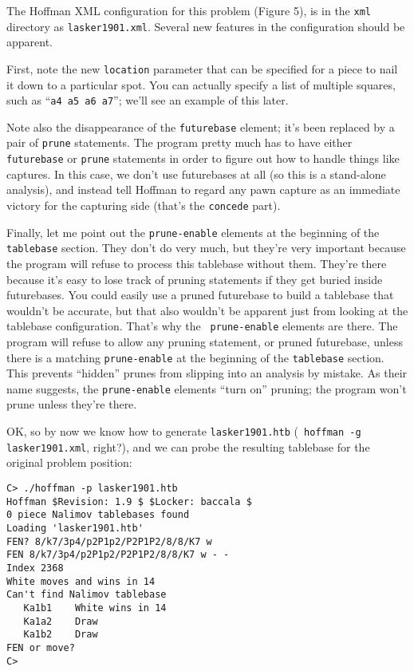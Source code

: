 \documentclass[11pt]{article}
\begin{document}
The Hoffman XML configuration for this problem (Figure 5), is in the
{\tt xml} directory as {\tt lasker1901.xml}.  Several new
features in the configuration should be apparent.

First, note the new {\tt location} parameter that can be specified for
a piece to nail it down to a particular spot.  You can actually
specify a list of multiple squares, such as ``{\tt a4 a5 a6 a7}'';
we'll see an example of this later.

Note also the disappearance of the {\tt futurebase} element; it's been
replaced by a pair of {\tt prune} statements.  The program pretty much
has to have either {\tt futurebase} or {\tt prune} statements in order
to figure out how to handle things like captures.  In this case, we
don't use futurebases at all (so this is a stand-alone analysis), and
instead tell Hoffman to regard any pawn capture as an immediate
victory for the capturing side (that's the {\tt concede} part).

Finally, let me point out the {\tt prune-enable} elements at the
beginning of the {\tt tablebase} section.  They don't do very much,
but they're very important because the program will refuse to process
this tablebase without them.  They're there because it's easy to lose
track of pruning statements if they get buried inside futurebases.
You could easily use a pruned futurebase to build a tablebase that
wouldn't be accurate, but that also wouldn't be apparent just from
looking at the tablebase configuration.  That's why the {\tt
prune-enable} elements are there.  The program will refuse to allow
any pruning statement, or pruned futurebase, unless there is a
matching {\tt prune-enable} at the beginning of the {\tt tablebase}
section.  This prevents ``hidden'' prunes from slipping into an
analysis by mistake.  As their name suggests, the {\tt prune-enable}
elements ``turn on'' pruning; the program won't prune unless they're there.

OK, so by now we know how to generate {\tt lasker1901.htb} ({\tt
hoffman -g lasker1901.xml}, right?), and we can probe the resulting
tablebase for the original problem position:

\begin{verbatim}
C> ./hoffman -p lasker1901.htb
Hoffman $Revision: 1.9 $ $Locker: baccala $
0 piece Nalimov tablebases found
Loading 'lasker1901.htb'
FEN? 8/k7/3p4/p2P1p2/P2P1P2/8/8/K7 w
FEN 8/k7/3p4/p2P1p2/P2P1P2/8/8/K7 w - -
Index 2368
White moves and wins in 14
Can't find Nalimov tablebase
   Ka1b1    White wins in 14
   Ka1a2    Draw
   Ka1b2    Draw
FEN or move?
C>
\end{verbatim}
\end{document}
